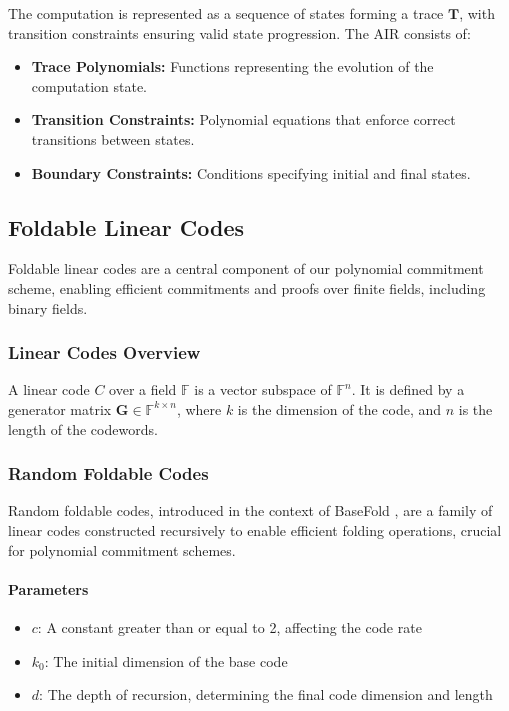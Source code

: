 \documentclass{article}
\theoremstyle{plain}
\theoremstyle{definition}
\theoremstyle{remark}
\theoremstyle{problem}
\begin{document}
The computation is represented as a sequence of states forming a trace $\mathbf{T}$, with transition constraints ensuring valid state progression. The AIR consists of:

\begin{itemize}
    \item \textbf{Trace Polynomials:} Functions representing the evolution of the computation state.
    \item \textbf{Transition Constraints:} Polynomial equations that enforce correct transitions between states.
    \item \textbf{Boundary Constraints:} Conditions specifying initial and final states.
\end{itemize}

\subsection{Foldable Linear Codes}

Foldable linear codes are a central component of our polynomial commitment scheme, enabling efficient commitments and proofs over finite fields, including binary fields.

\subsubsection{Linear Codes Overview}

A linear code $C$ over a field $\mathbb{F}$ is a vector subspace of $\mathbb{F}^n$. It is defined by a generator matrix $\mathbf{G} \in \mathbb{F}^{k \times n}$, where $k$ is the dimension of the code, and $n$ is the length of the codewords.

\subsubsection{Random Foldable Codes}

Random foldable codes, introduced in the context of BaseFold \cite{kim2023basefold}, are a family of linear codes constructed recursively to enable efficient folding operations, crucial for polynomial commitment schemes.

\paragraph{Parameters}
\begin{itemize}
    \item $c$: A constant greater than or equal to 2, affecting the code rate
    \item $k_0$: The initial dimension of the base code
    \item $d$: The depth of recursion, determining the final code dimension and length
\end{itemize}
\end{document}
